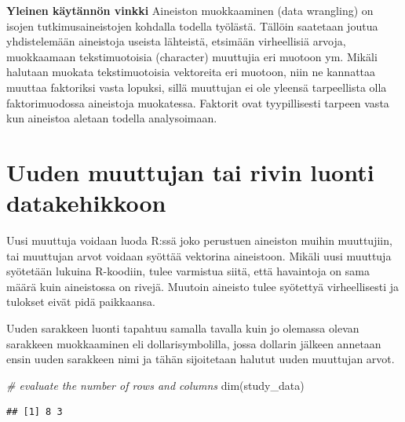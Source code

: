 \documentclass[
]{book}
\newenvironment{Shaded}{\begin{snugshade}}{\end{snugshade}}
\newcommand{\CommentTok}[1]{\textcolor[rgb]{0.56,0.35,0.01}{\textit{#1}}}
\newcommand{\FunctionTok}[1]{\textcolor[rgb]{0.00,0.00,0.00}{#1}}
\newcommand{\NormalTok}[1]{#1}
\begin{document}
\textbf{Yleinen käytännön vinkki}
Aineiston muokkaaminen (data wrangling) on isojen tutkimusaineistojen kohdalla todella työlästä. Tällöin saatetaan joutua yhdistelemään aineistoja useista lähteistä, etsimään virheellisiä arvoja, muokkaamaan tekstimuotoisia (character) muuttujia eri muotoon ym. Mikäli halutaan muokata tekstimuotoisia vektoreita eri muotoon, niin ne kannattaa muuttaa faktoriksi vasta lopuksi, sillä muuttujan ei ole yleensä tarpeellista olla faktorimuodossa aineistoja muokatessa. Faktorit ovat tyypillisesti tarpeen vasta kun aineistoa aletaan todella analysoimaan.

\hypertarget{data-frame-wrangling}{%
\section{Uuden muuttujan tai rivin luonti datakehikkoon}\label{data-frame-wrangling}}

Uusi muuttuja voidaan luoda R:ssä joko perustuen aineiston muihin muuttujiin, tai muuttujan arvot voidaan syöttää vektorina aineistoon. Mikäli uusi muuttuja syötetään lukuina R-koodiin, tulee varmistua siitä, että havaintoja on sama määrä kuin aineistossa on rivejä. Muutoin aineisto tulee syötettyä virheellisesti ja tulokset eivät pidä paikkaansa.

Uuden sarakkeen luonti tapahtuu samalla tavalla kuin jo olemassa olevan sarakkeen muokkaaminen eli dollarisymbolilla, jossa dollarin jälkeen annetaan ensin uuden sarakkeen nimi ja tähän sijoitetaan halutut uuden muuttujan arvot.

\begin{Shaded}
\begin{Highlighting}[]
\CommentTok{\# evaluate the number of rows and columns}
\FunctionTok{dim}\NormalTok{(study\_data)}
\end{Highlighting}
\end{Shaded}

\begin{verbatim}
## [1] 8 3
\end{verbatim}
\end{document}
